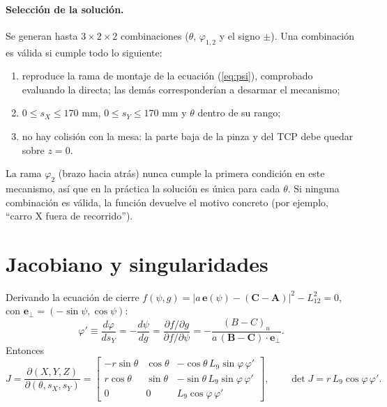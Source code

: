 \documentclass[a4paper,12pt]{article}
\begin{document}
\paragraph{Selección de la solución.} Se generan hasta $3\times2\times2$ combinaciones ($\theta$,
$\varphi_{1,2}$ y el signo $\pm$). Una combinación es válida si cumple todo lo siguiente:
\begin{enumerate}
\item reproduce la rama de montaje de la ecuación (\ref{eq:psi}), comprobado evaluando la directa; las
      demás corresponderían a desarmar el mecanismo;
\item $0 \le s_X \le 170$ mm, $0 \le s_Y \le 170$ mm y $\theta$ dentro de su rango;
\item no hay colisión con la mesa: la parte baja de la pinza y del TCP debe quedar sobre $z = 0$.
\end{enumerate}
La rama $\varphi_2$ (brazo hacia atrás) nunca cumple la primera condición en este mecanismo, así que en la
práctica la solución es única para cada $\theta$. Si ninguna combinación es válida, la función devuelve el
motivo concreto (por ejemplo, ``carro X fuera de recorrido'').

\section{Jacobiano y singularidades}

Derivando la ecuación de cierre $f(\psi, g) = |a\,\mathbf{e}(\psi) - (\mathbf{C}-\mathbf{A})|^2 - L_{12}^2 = 0$,
con $\mathbf{e}_\perp = (-\sin\psi, \cos\psi)$:
\begin{equation}
\varphi' \equiv \frac{d\varphi}{ds_Y} = -\frac{d\psi}{dg} = \frac{\partial f/\partial g}{\partial f/\partial\psi}
= -\frac{(B-C)_u}{a\,(\mathbf{B}-\mathbf{C})\cdot\mathbf{e}_\perp}.
\end{equation}
Entonces
\begin{equation}
J = \frac{\partial(X,Y,Z)}{\partial(\theta, s_X, s_Y)} =
\begin{bmatrix}
-r\sin\theta & \cos\theta & -\cos\theta\, L_9\sin\varphi\,\varphi'\\
 r\cos\theta & \sin\theta & -\sin\theta\, L_9\sin\varphi\,\varphi'\\
 0 & 0 & L_9\cos\varphi\,\varphi'
\end{bmatrix},\qquad
\det J = r\,L_9\cos\varphi\,\varphi' .
\end{equation}
\end{document}

